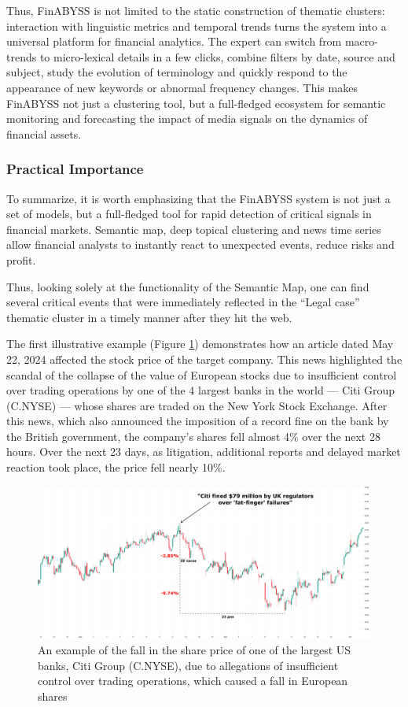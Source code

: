 Thus, FinABYSS is not limited to the static construction of thematic clusters: interaction with linguistic metrics
and temporal trends turns the system into a universal platform for financial analytics. The expert can switch from
macro-trends to micro-lexical details in a few clicks, combine filters by date, source and subject, study the evolution
of terminology and quickly respond to the appearance of new keywords or abnormal frequency changes. This makes FinABYSS
not just a clustering tool, but a full-fledged ecosystem for semantic monitoring and forecasting the impact of media
signals on the dynamics of financial assets.

\subsubsection{Practical Importance}

To summarize, it is worth emphasizing that the FinABYSS system is not just a set of models, but a full-fledged
tool for rapid detection of critical signals in financial markets. Semantic map, deep topical clustering
and news time series allow financial analysts to instantly react to unexpected events, reduce risks
and profit.

Thus, looking solely at the functionality of the Semantic Map, one can find several critical events that were
immediately reflected in the “Legal case” thematic cluster in a timely manner after they hit the web.

The first illustrative example (Figure \ref{fig:citi_group}) demonstrates how an article dated May 22, 2024
affected the stock price of the target company. This news highlighted the scandal of the collapse of the value
of European stocks due to insufficient control over trading operations by one of the 4 largest banks
in the world --- Citi Group (C.NYSE) --- whose shares are traded on the New York Stock Exchange. After this news,
which also announced the imposition of a record fine on the bank by the British government, the company's shares
fell almost 4\% over the next 28 hours. Over the next 23 days, as litigation, additional reports and delayed
market reaction took place, the price fell nearly 10\%.

\begin{figure}[H]
    \centering
    \includegraphics[width=1\linewidth]{img/citi_group.png}
    \caption{An example of the fall in the share price of one of the largest US banks, Citi Group
    (C.NYSE), due to allegations of insufficient control over trading operations, which caused
    a fall in European shares}
    \label{fig:citi_group}
\end{figure}

